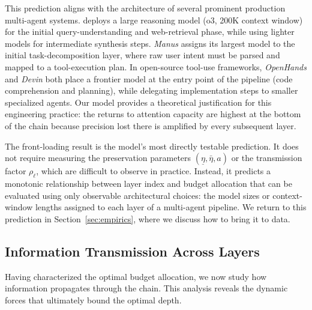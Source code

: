 This prediction aligns with the architecture of several prominent production multi-agent systems. \citet{openai2025deepresearch} deploys a large reasoning model (o3, 200K context window) for the initial query-understanding and web-retrieval phase, while using lighter models for intermediate synthesis steps. \textit{Manus} \citep{manus2025} assigns its largest model to the initial task-decomposition layer, where raw user intent must be parsed and mapped to a tool-execution plan. In open-source tool-use frameworks, \textit{OpenHands} \citep{openhands2024} and \textit{Devin} \citep{cognition2024devin} both place a frontier model at the entry point of the pipeline (code comprehension and planning), while delegating implementation steps to smaller specialized agents. Our model provides a theoretical justification for this engineering practice: the returns to attention capacity are highest at the bottom of the chain because precision lost there is amplified by every subsequent layer.

\begin{remark}\label{rem:front_loading_empirical}
The front-loading result is the model's most directly testable prediction. It does not require measuring the preservation parameters $(\underline{\eta}, \bar{\eta}, a)$ or the transmission factor $\rho_\ell$, which are difficult to observe in practice. Instead, it predicts a monotonic relationship between layer index and budget allocation that can be evaluated using only observable architectural choices: the model sizes or context-window lengths assigned to each layer of a multi-agent pipeline. We return to this prediction in Section~\ref{sec:empirics}, where we discuss how to bring it to data.
\end{remark}

\subsection{Information Transmission Across Layers}
\label{subsec:info_transmission}

Having characterized the optimal budget allocation, we now study how information propagates through the chain. This analysis reveals the dynamic forces that ultimately bound the optimal depth.

